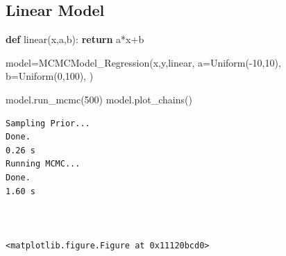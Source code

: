 \documentclass[]{article}
\newenvironment{Shaded}{}{}
\newcommand{\KeywordTok}[1]{\textcolor[rgb]{0.00,0.44,0.13}{\textbf{{#1}}}}
\newcommand{\DecValTok}[1]{\textcolor[rgb]{0.25,0.63,0.44}{{#1}}}
\newcommand{\NormalTok}[1]{{#1}}
\begin{document}
\subsection{Linear Model}\label{linear-model}

\begin{Shaded}
\begin{Highlighting}[]
\KeywordTok{def} \NormalTok{linear(x,a,b):}
    \KeywordTok{return} \NormalTok{a*x+b}

\NormalTok{model=MCMCModel_Regression(x,y,linear,}
                \NormalTok{a=Uniform(-}\DecValTok{10}\NormalTok{,}\DecValTok{10}\NormalTok{),}
                \NormalTok{b=Uniform(}\DecValTok{0}\NormalTok{,}\DecValTok{100}\NormalTok{),}
                \NormalTok{)}

\NormalTok{model.run_mcmc(}\DecValTok{500}\NormalTok{)}
\NormalTok{model.plot_chains()}
\end{Highlighting}
\end{Shaded}

\begin{verbatim}
Sampling Prior...
Done.
0.26 s
Running MCMC...
Done.
1.60 s



<matplotlib.figure.Figure at 0x11120bcd0>
\end{verbatim}
\end{document}
